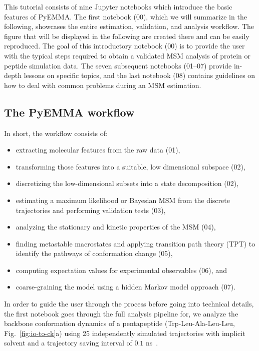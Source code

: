\documentclass[9pt,tutorial]{livecoms}
\begin{document}
This tutorial consists of nine Jupyter notebooks which introduce the basic features of PyEMMA.
The first notebook (00), which we will summarize in the following, showcases the entire estimation, validation, and analysis workflow. 
The figure that will be displayed in the following are created there and can be easily reproduced.
The goal of this introductory notebook (00) is to provide the user with the typical steps required to obtain a validated MSM analysis of protein or peptide simulation data.
The seven subsequent notebooks (01--07) provide in-depth lessons on specific topics, and the last notebook (08) contains guidelines on how to deal with common problems during an MSM estimation.

\subsection{The PyEMMA workflow}

In short, the workflow consists of:
\begin{itemize}
	\item extracting molecular features from the raw data (01),
	\item transforming those features into a suitable, low dimensional subspace (02),
	\item discretizing the low-dimensional subsets into a state decomposition (02),
	\item estimating a maximum likelihood or Bayesian MSM from the discrete trajectories and performing validation tests (03),
	\item analyzing the stationary and kinetic properties of the MSM (04),
	\item finding metastable macrostates and applying transition path theory (TPT) to identify the pathways of conformation change (05),
	\item computing expectation values for experimental observables (06), and
	\item coarse-graining the model using a hidden Markov model approach (07).
\end{itemize}

In order to guide the user through the process before going into technical details,
the first notebook goes through the full analysis pipeline for,
we analyze the backbone conformation dynamics of a pentapeptide (Trp-Leu-Ala-Leu-Leu, Fig.~\ref{fig:io-to-ck}a) using 25 independently simulated trajectories with implicit solvent and a trajectory saving interval of $0.1$ ns~\cite{pyemma}.
\end{document}
